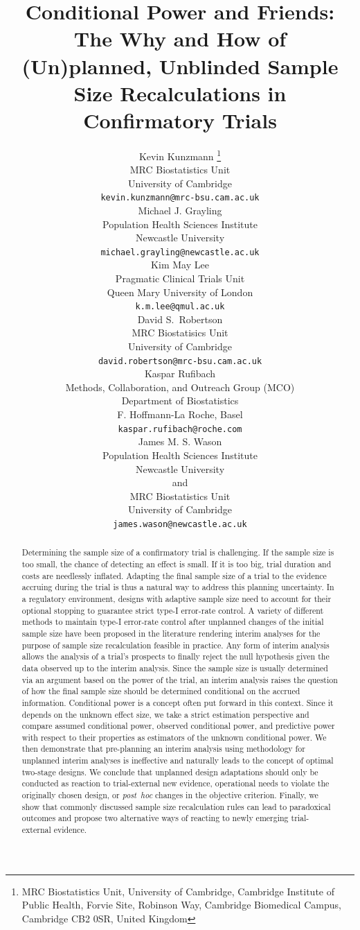 \documentclass{article}
\title{Conditional Power and Friends: The Why and How of (Un)planned, Unblinded Sample Size Recalculations in Confirmatory Trials}
\author{
  Kevin Kunzmann \thanks{
        MRC Biostatistics Unit, University of Cambridge,
        Cambridge Institute of Public Health,
        Forvie Site, Robinson Way,
        Cambridge Biomedical Campus,
        Cambridge CB2 0SR,
        United Kingdom
    }\\
    MRC Biostatistics Unit \\
    University of Cambridge \\
    \texttt{kevin.kunzmann@mrc-bsu.cam.ac.uk} \\
    
    Michael J. Grayling \\
    Population Health Sciences Institute \\
    Newcastle University \\
    \texttt{michael.grayling@newcastle.ac.uk} \\
    
    Kim May Lee \\
    Pragmatic Clinical Trials Unit\\
    Queen Mary University of London\\
    \texttt{k.m.lee@qmul.ac.uk} \\
    
    David S.\ Robertson \\
    MRC Biostatisics Unit\\
    University of Cambridge\\
    \texttt{david.robertson@mrc-bsu.cam.ac.uk} \\
    
    Kaspar Rufibach \\
    Methods, Collaboration, and Outreach Group (MCO) \\
    Department of Biostatistics\\
    F. Hoffmann-La Roche, Basel\\
    \texttt{kaspar.rufibach@roche.com} \\
     
    James M. S. Wason \\
    Population Health Sciences Institute \\
    Newcastle University\\
    and \\
     MRC Biostatistics Unit \\
    University of Cambridge \\
    \texttt{james.wason@newcastle.ac.uk}
}
\begin{document}
\maketitle

\captionsetup{width=\textwidth}


\newpage

\begin{abstract}
Determining the sample size of a confirmatory trial is challenging.
If the sample size is too small, the chance of detecting an effect is small.
If it is too big, trial duration and costs are needlessly inflated.
Adapting the final sample size of a trial to the evidence accruing 
during the trial is thus a natural way to address 
this planning uncertainty.
In a regulatory environment, 
designs with adaptive sample size need to 
account for their optional stopping to guarantee
strict type-I error-rate control. 
A variety of different methods to maintain type-I error-rate control
after unplanned changes of the initial sample size have been proposed 
in the literature rendering interim analyses for
the purpose of sample size recalculation feasible in
practice.
Any form of interim analysis allows the analysis of
a trial's prospects to finally reject the null hypothesis 
given the data observed up to the interim analysis.
Since the sample size is usually determined via an 
argument based on the power of the trial, 
an interim analysis raises the question of
how the final sample size should be determined conditional on the accrued information.
Conditional power is a concept often put forward in this context.
Since it depends on the unknown effect size, 
we take a strict estimation perspective and compare
assumed conditional power, observed conditional power, 
and predictive power with respect to their properties as estimators 
of the unknown conditional power.
We then demonstrate that pre-planning an interim analysis using 
methodology for unplanned interim analyses is ineffective and 
naturally leads to the concept of optimal two-stage designs.
We conclude that unplanned design adaptations should only be conducted
as reaction to trial-external new evidence, operational needs to violate the originally chosen design, 
or \textit{post~hoc} changes in the objective criterion.
Finally, we show that commonly discussed sample size recalculation rules can lead to paradoxical outcomes and propose two alternative ways of reacting to
newly emerging trial-external evidence.
\end{abstract}
\end{document}
